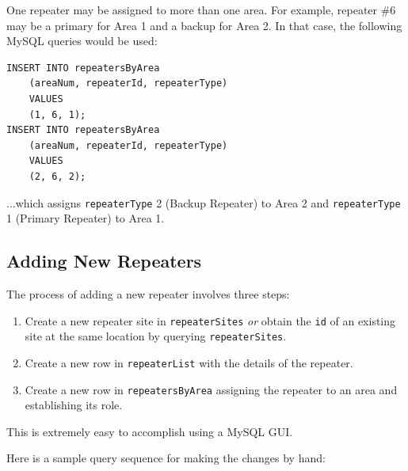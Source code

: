 \documentclass[pdflatex,letterpaper,twoside,12pt]{book}
\begin{document}
One repeater may be assigned to more than one area.  For example, repeater \#6 may be a primary for Area 1 and a backup for Area 2.  In that case, the following MySQL queries would be used:

\begin{verbatim}
INSERT INTO repeatersByArea
	(areaNum, repeaterId, repeaterType)
	VALUES
	(1, 6, 1);
INSERT INTO repeatersByArea
	(areaNum, repeaterId, repeaterType)
	VALUES
	(2, 6, 2);
\end{verbatim}

...which assigns \texttt{repeaterType} 2 (Backup Repeater) to Area 2 and \texttt{repeaterType} 1 (Primary Repeater) to Area 1.


\subsection{Adding New Repeaters}

The process of adding a new repeater involves three steps:

\begin{enumerate}
\item Create a new repeater site in \texttt{repeaterSites} \emph{or} obtain the \texttt{id} of an existing site at the same location by querying \texttt{repeaterSites}.
\item Create a new row in \texttt{repeaterList} with the details of the repeater.
\item Create a new row in \texttt{repeatersByArea} assigning the repeater to an area and establishing its role.
\end{enumerate}

This is extremely easy to accomplish using a MySQL GUI.

Here is a sample query sequence for making the changes by hand:
\end{document}
